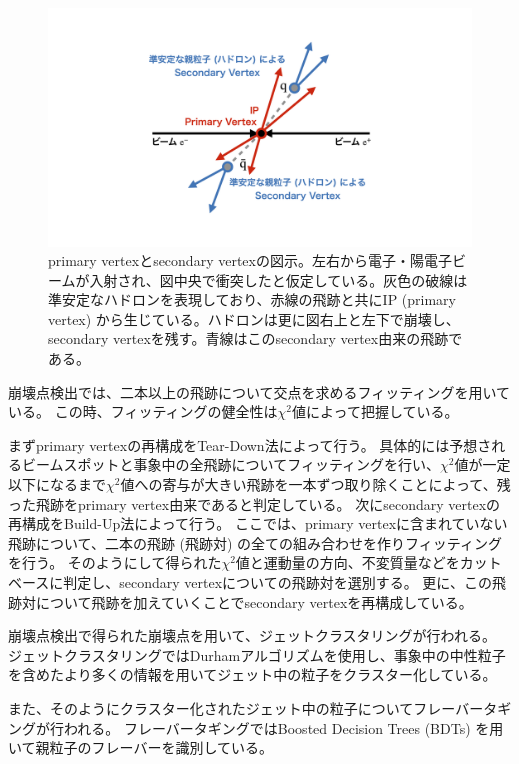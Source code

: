\begin{figure}[htbp]
 \centering
 \includegraphics[trim = 0 100 0 50, width=1.0\textwidth, clip]{Figure/1Introduction/6ReconstructedVertex.png}
 \caption[primary vertexとsecondary vertexの図示]{primary vertexとsecondary vertexの図示。左右から電子・陽電子ビームが入射され、図中央で衝突したと仮定している。灰色の破線は準安定なハドロンを表現しており、赤線の飛跡と共にIP (primary vertex) から生じている。ハドロンは更に図右上と左下で崩壊し、secondary vertexを残す。青線はこのsecondary vertex由来の飛跡である。}
 \label{6ReconstructedVertex}
\end{figure}

崩壊点検出では、二本以上の飛跡について交点を求めるフィッティングを用いている。
この時、フィッティングの健全性は$\chi^2$値によって把握している。

まずprimary vertexの再構成をTear-Down法によって行う。
具体的には予想されるビームスポットと事象中の全飛跡についてフィッティングを行い、$\chi^2$値が一定以下になるまで$\chi^2$値への寄与が大きい飛跡を一本ずつ取り除くことによって、残った飛跡をprimary vertex由来であると判定している。
次にsecondary vertexの再構成をBuild-Up法によって行う。
ここでは、primary vertexに含まれていない飛跡について、二本の飛跡 (飛跡対) の全ての組み合わせを作りフィッティングを行う。
そのようにして得られた$\chi^2$値と運動量の方向、不変質量などをカットベースに判定し、secondary vertexについての飛跡対を選別する。
更に、この飛跡対について飛跡を加えていくことでsecondary vertexを再構成している。


崩壊点検出で得られた崩壊点を用いて、ジェットクラスタリングが行われる。
ジェットクラスタリングではDurhamアルゴリズム\cite{Durhampaper}を使用し、事象中の中性粒子を含めたより多くの情報を用いてジェット中の粒子をクラスター化している。

また、そのようにクラスター化されたジェット中の粒子についてフレーバータギングが行われる。
フレーバータギングではBoosted Decision Trees (BDTs) を用いて親粒子のフレーバーを識別している。

